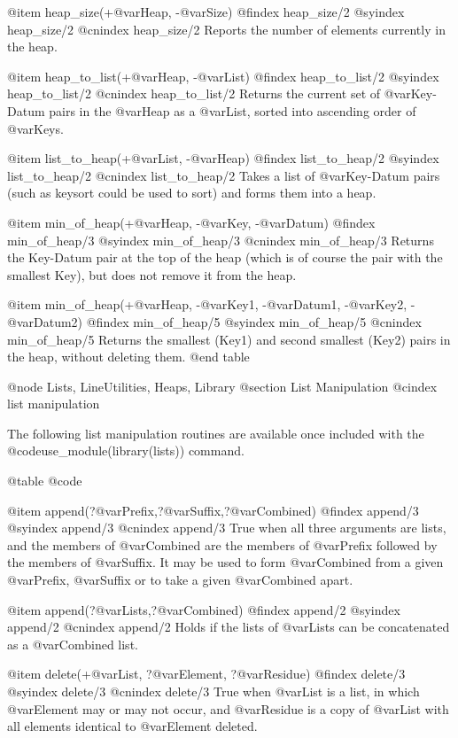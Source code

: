 {{{{{{{{{@item heap_size(+@var{Heap}, -@var{Size})
@findex heap_size/2
@syindex        heap_size/2
@cnindex        heap_size/2
Reports the number of elements currently in the heap.

@item heap_to_list(+@var{Heap}, -@var{List})
@findex heap_to_list/2
@syindex        heap_to_list/2
@cnindex        heap_to_list/2
Returns the current set of @var{Key-Datum} pairs in the @var{Heap} as a
@var{List}, sorted into ascending order of @var{Keys}.

@item list_to_heap(+@var{List}, -@var{Heap})
@findex list_to_heap/2
@syindex        list_to_heap/2
@cnindex        list_to_heap/2
Takes a list of @var{Key-Datum} pairs (such as keysort could be used to sort)
and forms them into a heap.

@item min_of_heap(+@var{Heap},  -@var{Key},  -@var{Datum})
@findex min_of_heap/3
@syindex min_of_heap/3
@cnindex min_of_heap/3
Returns the Key-Datum pair at the top of the heap (which is of course
the pair with the smallest Key), but does not remove it from the heap.

@item min_of_heap(+@var{Heap},  -@var{Key1},  -@var{Datum1},
-@var{Key2},  -@var{Datum2})
@findex min_of_heap/5
@syindex min_of_heap/5
@cnindex min_of_heap/5
Returns the smallest (Key1) and second smallest (Key2) pairs in the
heap, without deleting them.
@end table

@node Lists, LineUtilities, Heaps, Library
@section List Manipulation
@cindex list manipulation

The following list manipulation routines are available once included
with the @code{use_module(library(lists))} command. 

@table @code

@item append(?@var{Prefix},?@var{Suffix},?@var{Combined})
@findex append/3
@syindex append/3
@cnindex append/3
True when all three arguments are lists, and the members of
@var{Combined} are the members of @var{Prefix} followed by the members of @var{Suffix}.
It may be used to form @var{Combined} from a given @var{Prefix}, @var{Suffix} or to take
a given @var{Combined} apart.

@item append(?@var{Lists},?@var{Combined})
@findex append/2
@syindex append/2
@cnindex append/2
Holds if the lists of @var{Lists} can be concatenated as a
@var{Combined} list.

@item delete(+@var{List}, ?@var{Element}, ?@var{Residue})
@findex delete/3
@syindex delete/3
@cnindex delete/3
True when @var{List} is a list, in which @var{Element} may or may not
occur, and @var{Residue} is a copy of @var{List} with all elements
identical to @var{Element} deleted.

}}}}}}}}}
